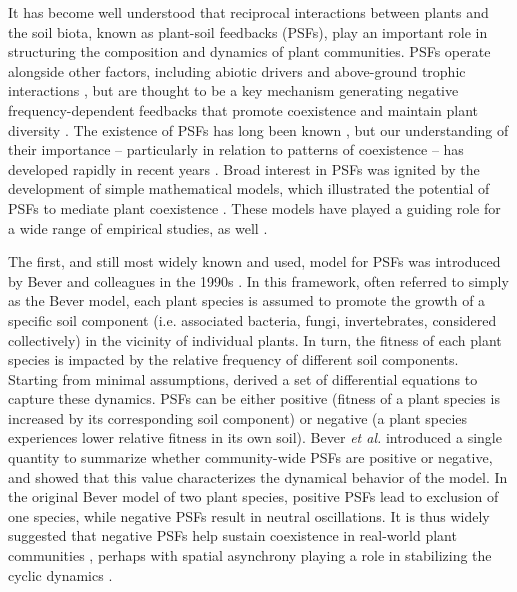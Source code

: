 \documentclass[11pt]{article}
\begin{document}
It has become well understood that reciprocal interactions between plants and the soil biota, known as plant-soil feedbacks (PSFs), play an important role in structuring the composition and dynamics of plant communities. PSFs operate alongside other factors, including abiotic drivers \citep{bennett2019mechanisms} and above-ground trophic interactions \citep{van2009empirical}, but are thought to be a key mechanism generating negative frequency-dependent feedbacks that promote coexistence and maintain plant diversity \citep{kulmatiski2008plant,van2013plant,bever2015maintenance}. The existence of PSFs has long been known \citep{van1993plant,bever1994feedback}, but our understanding of their importance -- particularly in relation to patterns of coexistence -- has developed rapidly in recent years \citep{klironomos2002feedback,petermann2008janzen,mangan2010negative}. Broad interest in PSFs was ignited by the development of simple mathematical models, which illustrated the potential of PSFs to mediate plant coexistence \citep{bever1997incorporating,bever2003soil,ke2015incorporating}. These models have played a guiding role for a wide range of empirical studies, as well \citep{kulmatiski2008plant,kulmatiski2011testing,pernilla2010plant}.

The first, and still most widely known and used, model for PSFs was introduced by Bever and colleagues in the 1990s \citep{bever1992ecological,bever1997incorporating,bever1999dynamics,bever2003soil}. In this framework, often referred to simply as the Bever model, each plant species is assumed to promote the growth of a specific soil component (i.e. associated bacteria, fungi, invertebrates, considered collectively) in the vicinity of individual plants. In turn, the fitness of each plant species is impacted by the relative frequency of different soil components. Starting from minimal assumptions, \citet{bever1997incorporating} derived a set of differential equations to capture these dynamics. PSFs can be either positive (fitness of a plant species is increased by its corresponding soil component) or negative (a plant species experiences lower relative fitness in its own soil). Bever \textit{et al.} introduced a single quantity to summarize whether community-wide PSFs are positive or negative, and showed that this value characterizes the dynamical behavior of the model. In the original Bever model of two plant species, positive PSFs lead to exclusion of one species, while negative PSFs result in neutral oscillations. It is thus widely suggested that negative PSFs help sustain coexistence in real-world plant communities \citep{kulmatiski2008plant,van2013plant}, perhaps with spatial asynchrony playing a role in stabilizing the cyclic dynamics \citep{revilla2013plant,bever2003soil}.
\end{document}
